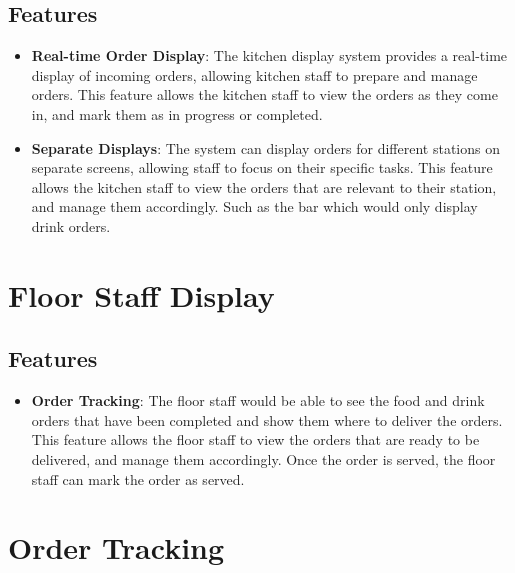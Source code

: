 \subsection{Features}
\begin{itemize}
    \item \textbf{Real-time Order Display}: The kitchen display system provides a real-time display of incoming orders, allowing kitchen staff to prepare and manage orders. This feature allows the kitchen staff to view the orders as they come in, and mark them as in progress or completed.
    \item \textbf{Separate Displays}: The system can display orders for different stations on separate screens, allowing staff to focus on their specific tasks. This feature allows the kitchen staff to view the orders that are relevant to their station, and manage them accordingly. Such as the bar which would only display drink orders.
\end{itemize}

\section{Floor Staff Display}
\subsection{Features}
\begin{itemize}
    \item \textbf{Order Tracking}: The floor staff would be able to see the food and drink orders that have been completed and show them where to deliver the orders. This feature allows the floor staff to view the orders that are ready to be delivered, and manage them accordingly. Once the order is served, the floor staff can mark the order as served.
\end{itemize}

\section{Order Tracking}